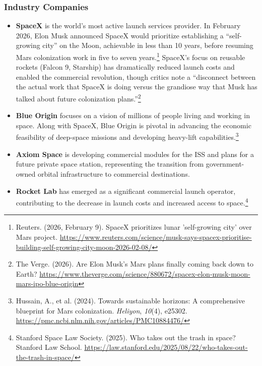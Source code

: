 \subsubsection{Industry Companies}

\begin{itemize}
  \item \textbf{SpaceX} is the world’s most active launch services provider. In February 2026, Elon Musk announced SpaceX would prioritize establishing a “self-growing city” on the Moon, achievable in less than 10 years, before resuming Mars colonization work in five to seven years.\footnote{Reuters. (2026, February 9). SpaceX prioritizes lunar 'self-growing city' over Mars project. \url{https://www.reuters.com/science/musk-says-spacex-prioritise-building-self-growing-city-moon-2026-02-08/}} SpaceX’s focus on reusable rockets (Falcon 9, Starship) has dramatically reduced launch costs and enabled the commercial revolution, though critics note a “disconnect between the actual work that SpaceX is doing versus the grandiose way that Musk has talked about future colonization plans.”\footnote{The Verge. (2026). Are Elon Musk's Mars plans finally coming back down to Earth? \url{https://www.theverge.com/science/880672/spacex-elon-musk-moon-mars-ipo-blue-origin}}
  \item \textbf{Blue Origin} focuses on a vision of millions of people living and working in space. Along with SpaceX, Blue Origin is pivotal in advancing the economic feasibility of deep-space missions and developing heavy-lift capabilities.\footnote{Hussain, A., et al. (2024). Towards sustainable horizons: A comprehensive blueprint for Mars colonization. \emph{Heliyon}, \emph{10}(4), e25302. \url{https://pmc.ncbi.nlm.nih.gov/articles/PMC10884476/}}
  \item \textbf{Axiom Space} is developing commercial modules for the ISS and plans for a future private space station, representing the transition from government-owned orbital infrastructure to commercial destinations.
  \item \textbf{Rocket Lab} has emerged as a significant commercial launch operator, contributing to the decrease in launch costs and increased access to space.\footnote{Stanford Space Law Society. (2025). Who takes out the trash in space? Stanford Law School. \url{https://law.stanford.edu/2025/08/22/who-takes-out-the-trash-in-space/}}
\end{itemize}
